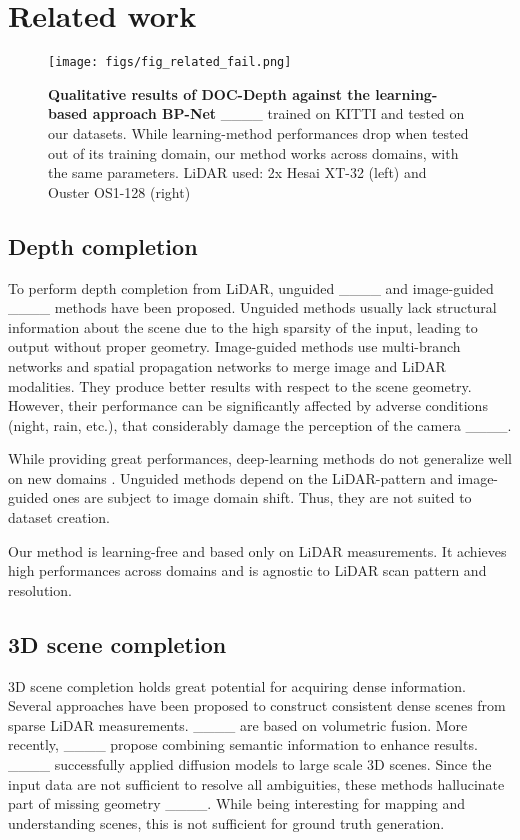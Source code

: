 \section{Related work}
\begin{figure}[t]
    \centering
    \texttt{[image: figs/fig\_related\_fail.png]}
    \vspace{-15pt}
    \caption{\textbf{Qualitative results of DOC-Depth against the learning-based approach BP-Net} ____ trained on KITTI and tested on our datasets. While learning-method performances drop when tested out of its training domain, our method works across domains, with the same parameters. LiDAR used: 2x Hesai XT-32 (left) and Ouster OS1-128 (right)}
    \label{fig:related_work_fail}
    \vspace{-15pt}
\end{figure}

\subsection{Depth completion}

To perform depth completion from LiDAR, unguided ____ and image-guided ____ methods have been proposed. Unguided methods usually lack structural information about the scene due to the high sparsity of the input, leading to output without proper geometry. Image-guided methods use multi-branch networks and spatial propagation networks to merge image and LiDAR modalities. They produce better results with respect to the scene geometry. However, their performance can be significantly affected by adverse conditions (night, rain, etc.), that considerably damage the perception of the camera ____.

While providing great performances, deep-learning methods do not generalize well on new domains . Unguided methods depend on the LiDAR-pattern and image-guided ones are subject to image domain shift. Thus, they are not suited to dataset creation.  

Our method is learning-free and based only on LiDAR measurements. It achieves high performances across domains and is agnostic to LiDAR scan pattern and resolution.


\subsection{3D scene completion}
3D scene completion holds great potential for acquiring dense information.
Several approaches have been proposed to construct consistent dense scenes from sparse LiDAR measurements. 
____ are based on volumetric fusion. More recently, ____ propose combining semantic information to enhance results. ____ successfully applied diffusion models to large scale 3D scenes. Since the input data are not sufficient to resolve all ambiguities, these methods hallucinate part of missing geometry ____. While being interesting for mapping and understanding scenes, this is not sufficient for ground truth generation. 

